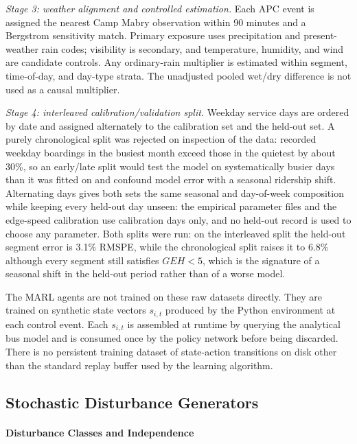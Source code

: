 \textit{Stage 3: weather alignment and controlled estimation.} Each APC event is assigned the nearest Camp Mabry observation within 90 minutes and a Bergstrom sensitivity match. Primary exposure uses precipitation and present-weather rain codes; visibility is secondary, and temperature, humidity, and wind are candidate controls. Any ordinary-rain multiplier is estimated within segment, time-of-day, and day-type strata. The unadjusted pooled wet/dry difference is not used as a causal multiplier.

\textit{Stage 4: interleaved calibration/validation split.} Weekday service days are ordered by date and assigned alternately to the calibration set and the held-out set. A purely chronological split was rejected on inspection of the data: recorded weekday boardings in the busiest month exceed those in the quietest by about 30\%, so an early/late split would test the model on systematically busier days than it was fitted on and confound model error with a seasonal ridership shift. Alternating days gives both sets the same seasonal and day-of-week composition while keeping every held-out day unseen: the empirical parameter files and the edge-speed calibration use calibration days only, and no held-out record is used to choose any parameter. Both splits were run: on the interleaved split the held-out segment error is 3.1\% RMSPE, while the chronological split raises it to 6.8\% although every segment still satisfies $GEH < 5$, which is the signature of a seasonal shift in the held-out period rather than of a worse model.

The MARL agents are not trained on these raw datasets directly. They are trained on synthetic state vectors $s_{i,t}$ produced by the Python environment at each control event. Each $s_{i,t}$ is assembled at runtime by querying the analytical bus model and is consumed once by the policy network before being discarded. There is no persistent training dataset of state-action transitions on disk other than the standard replay buffer used by the learning algorithm.

\subsection{Stochastic Disturbance Generators}
\label{subsec:stochastic-vars}

\paragraph{Disturbance Classes and Independence}

